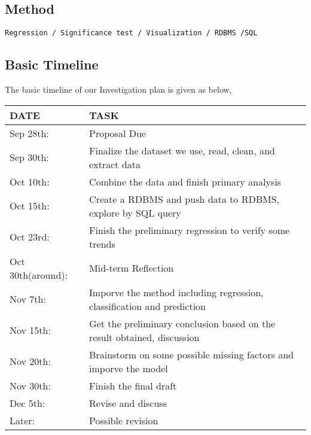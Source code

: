 \documentclass{article}
\begin{document}
\subsection{Method}
\texttt{Regression / Significance test / Visualization / RDBMS /SQL}

\subsection{Basic Timeline}
The basic timeline of our Investigation plan is given as below,
\begin{table}[H]
    \begin{tabular}{ll}
    DATE                                    & TASK                                                                                         \\ \hline
    \multicolumn{1}{|l|}{Sep 28th:}         & \multicolumn{1}{l|}{Proposal Due}                                                            \\ \hline
    \multicolumn{1}{|l|}{Sep 30th:}         & \multicolumn{1}{l|}{Finalize the dataset we use, read, clean, and extract data}              \\ \hline
    \multicolumn{1}{|l|}{Oct 10th:}         & \multicolumn{1}{l|}{Combine the data and finish primary analysis}                            \\ \hline
    \multicolumn{1}{|l|}{Oct 15th:}         & \multicolumn{1}{l|}{Create a RDBMS and push data to RDBMS, explore by SQL query}             \\ \hline
    \multicolumn{1}{|l|}{Oct 23rd:}         & \multicolumn{1}{l|}{Finish the preliminary regression to verify some trends}                 \\ \hline
    \multicolumn{1}{|l|}{Oct 30th(around):} & \multicolumn{1}{l|}{Mid-term Reflection}                                                     \\ \hline
    \multicolumn{1}{|l|}{Nov 7th:}          & \multicolumn{1}{l|}{Imporve the method including regression, classification and prediction}  \\ \hline
    \multicolumn{1}{|l|}{Nov 15th:}         & \multicolumn{1}{l|}{Get the preliminary conclusion based on the result obtained, discussion} \\ \hline
    \multicolumn{1}{|l|}{Nov 20th:}         & \multicolumn{1}{l|}{Brainstorm on some possible missing factors and imporve the model}       \\ \hline
    \multicolumn{1}{|l|}{Nov 30th:}         & \multicolumn{1}{l|}{Finish the final draft}                                                  \\ \hline
    \multicolumn{1}{|l|}{Dec 5th:}          & \multicolumn{1}{l|}{Revise and discuss}                                                      \\ \hline
    \multicolumn{1}{|l|}{Later:}            & \multicolumn{1}{l|}{Possible revision}                                                       \\ \hline
    \end{tabular}
    \end{table}
\end{document}

